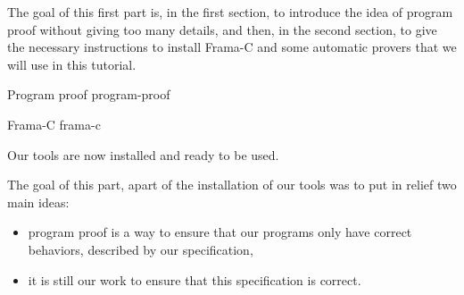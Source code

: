 The goal of this first part is, in the first section, to introduce the
idea of program proof without giving too many details, and then, in the
second section, to give the necessary instructions to install Frama-C
and some automatic provers that we will use in this tutorial.



\begin{levelTwo}
  {Program proof}
  {program-proof}
\end{levelTwo}

\begin{levelTwo}
  {Frama-C}
  {frama-c}
\end{levelTwo}



\horizontalLine
\newpage


Our tools are now installed and ready to be used.



The goal of this part, apart of the installation of our tools was to put
in relief two main ideas:


\begin{itemize}
\item program proof is a way to ensure that our programs only have correct
  behaviors, described by our specification,
\item it is still our work to ensure that this specification is correct.
\end{itemize}
